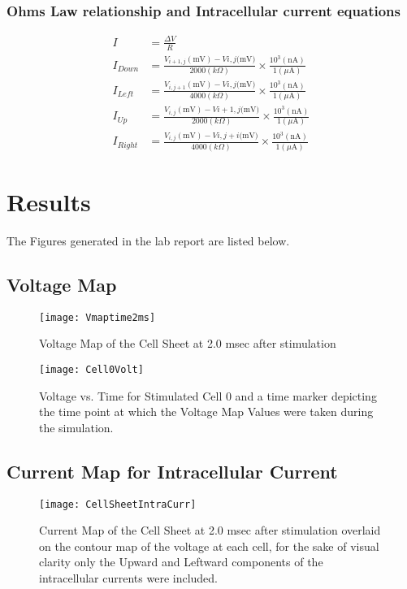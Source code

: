 \documentclass[10pt, titlepage]{article}
\begin{document}
\subsubsection{Ohms Law relationship and Intracellular current equations}
\begin{align}
I &= \frac{\Delta V}{R}\\
I_{Down} &= \frac{V_{i+1,j}(\mbox{mV}) - V{i,j}(\mbox{mV)}}{2000 (k \Omega)}\times \frac{10^3 (\mbox{nA})}{1 (\mu\mbox{A})}\\
I_{Left} &= \frac{V_{i,j+1}(\mbox{mV}) - V{i,j}(\mbox{mV)}}{4000 (k \Omega)}\times \frac{10^3 (\mbox{nA})}{1 (\mu\mbox{A})}\\
I_{Up} &= \frac{V_{i,j}(\mbox{mV}) - V{i+1,j}(\mbox{mV)}}{2000 (k \Omega)}\times \frac{10^3 (\mbox{nA})}{1 (\mu\mbox{A})}\\
I_{Right} &= \frac{V_{i,j}(\mbox{mV}) - V{i,j+i}(\mbox{mV)}}{4000 (k \Omega)}\times \frac{10^3 (\mbox{nA})}{1 (\mu\mbox{A})}
\end{align}

\section{Results}
The Figures generated in the lab report are listed below.
\subsection{Voltage Map}
\begin{figure}[htbp!]
\begin{center}
\texttt{[image: Vmaptime2ms]}
\caption{Voltage Map of the Cell Sheet at 2.0 msec after stimulation}
\end{center}
\end{figure}

\begin{figure}[htbp!]
\begin{center}
\texttt{[image: Cell0Volt]}
\caption[Voltage vs. Time for Cell 0]{Voltage vs. Time for Stimulated Cell 0 and a time marker depicting the time point at which the Voltage Map Values were taken during the simulation.}
\end{center}
\end{figure}

\subsection{Current Map for Intracellular Current}
\begin{figure}[htbp!]
\begin{center}
\texttt{[image: CellSheetIntraCurr]}
\caption[Current Map of the Cell Sheet at 2.0 msec post-stimulation]{Current Map of the Cell Sheet at 2.0 msec after stimulation overlaid on the contour map of the voltage at each cell, for the sake of visual clarity only the Upward and Leftward components of the intracellular currents were included.}
\end{center}
\end{figure}
\end{document}
